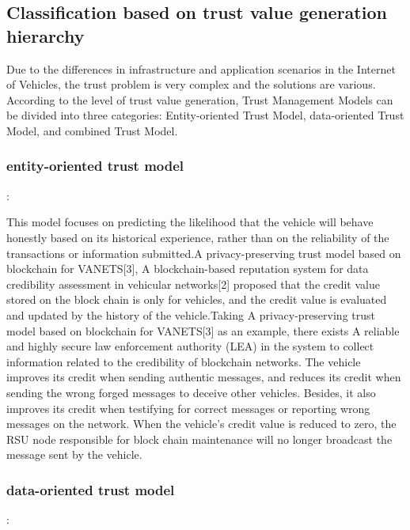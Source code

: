 \subsection{Classification based on trust value generation hierarchy}

Due to the differences in infrastructure and application scenarios in the Internet of Vehicles, the trust problem is very complex and the solutions are various. According to the level of trust value generation, Trust Management Models can be divided into three categories: Entity-oriented Trust Model, data-oriented Trust Model, and combined Trust Model.



\subsubsection{\bf entity-oriented trust model}: 

This model focuses on predicting the likelihood that the vehicle will behave honestly based on its historical experience, rather than on the reliability of the transactions or information submitted.A privacy-preserving trust model based on blockchain for VANETS[3], A blockchain-based reputation system for data credibility assessment in vehicular networks[2] proposed that the credit value stored on the block chain is only for vehicles, and the credit value is evaluated and updated by the history of the vehicle.Taking A privacy-preserving trust model based on blockchain for VANETS[3] as an example, there exists A reliable and highly secure law enforcement authority (LEA) in the system to collect information related to the credibility of blockchain networks. The vehicle improves its credit when sending authentic messages, and reduces its credit when sending the wrong forged messages to deceive other vehicles. Besides, it also improves its credit when testifying for correct messages or reporting wrong messages on the network. When the vehicle's credit value is reduced to zero, the RSU node responsible for block chain maintenance will no longer broadcast the message sent by the vehicle.

\subsubsection{\bf data-oriented trust model}: 

